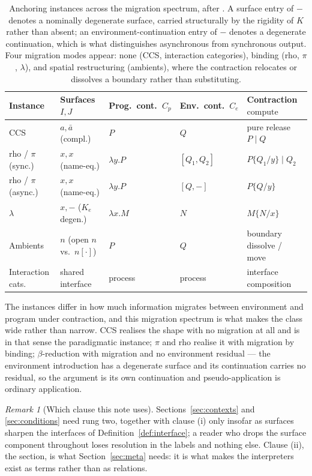 \documentclass[11pt,a4paper]{article}
\theoremstyle{definition}
\theoremstyle{plain}
\theoremstyle{remark}
\newtheorem{remark}[definition]{Remark}
\begin{document}
\begin{table}[h]
\centering
\small
\begin{tabular}{@{}lllll@{}}
\toprule
Instance & Surfaces $I,J$ & Prog.\ cont.\ $C_p$ & Env.\ cont.\ $C_e$ & Contraction $\mathrm{compute}$ \\
\midrule
CCS
  & $a,\bar a$ (compl.)
  & $P$ & $Q$
  & pure release $P \mid Q$ \\
rho / $\pi$ (sync.)
  & $x,x$ (name-eq.)
  & $\lambda y.P$ & $[Q_1,Q_2]$
  & $P\{Q_1/y\} \mid Q_2$ \\
rho / $\pi$ (async.)
  & $x,x$ (name-eq.)
  & $\lambda y.P$ & $[Q,-]$
  & $P\{Q/y\}$ \\
$\lambda$
  & $x,-$ ($K_e$ degen.)
  & $\lambda x.M$ & $N$
  & $M\{N/x\}$ \\
Ambients
  & $n$ (open $n$ vs.\ $n[\cdot]$)
  & $P$ & $Q$
  & boundary dissolve / move \\
Interaction cats.
  & shared interface
  & process & process
  & interface composition \\
\bottomrule
\end{tabular}
\caption{Anchoring instances across the migration spectrum, after
\cite[Tab.~1]{cost}. A surface entry of $-$ denotes a nominally degenerate surface,
carried structurally by the rigidity of $K$ rather than absent; an
environment-continuation entry of $-$ denotes a degenerate continuation, which is
what distinguishes asynchronous from synchronous output. Four migration modes
appear: none (CCS, interaction categories), binding (rho, $\pi$, $\lambda$), and
spatial restructuring (ambients), where the contraction relocates or dissolves a
boundary rather than substituting.}
\label{tab:instances}
\end{table}

The instances differ in how much information migrates between environment and program
under contraction, and this migration spectrum is what makes the class wide rather
than narrow. CCS realises the shape with no migration at all and is in that sense the
paradigmatic instance; $\pi$ and rho realise it with migration by binding;
$\beta$-reduction with migration and no environment residual --- the environment
introduction has a degenerate surface and its continuation carries no residual, so the
argument is its own continuation and pseudo-application is ordinary application.

\begin{remark}[Which clause this note uses]
\label{rem:whichhalf}
Sections~\ref{sec:contexts} and \ref{sec:conditions} need rung two, together with
clause (i) only insofar as surfaces sharpen the interfaces of
Definition~\ref{def:interface}; a reader who drops the surface component throughout
loses resolution in the labels and nothing else. Clause (ii), the section, is what
Section~\ref{sec:meta} needs: it is what makes the interpreters exist as terms rather
than as relations.
\end{remark}
\end{document}
